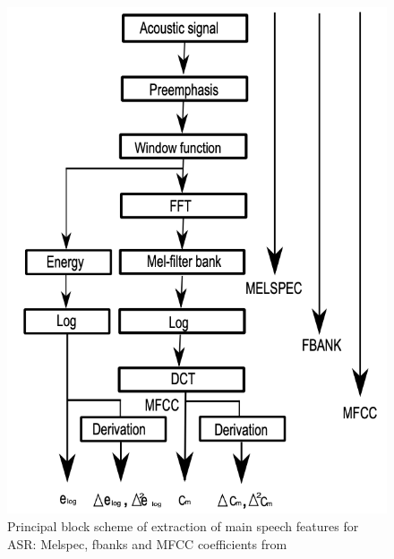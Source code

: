 \begin{figure}
    \begin{center}
    \includegraphics[scale=0.3]{imgs/features.png}
    \caption{Principal block scheme of extraction of main speech features for ASR: Melspec, fbanks and MFCC coefficients from \cite{kiktova2013comparison}}
    \label{feature_block}    
    \end{center}
\end{figure}

